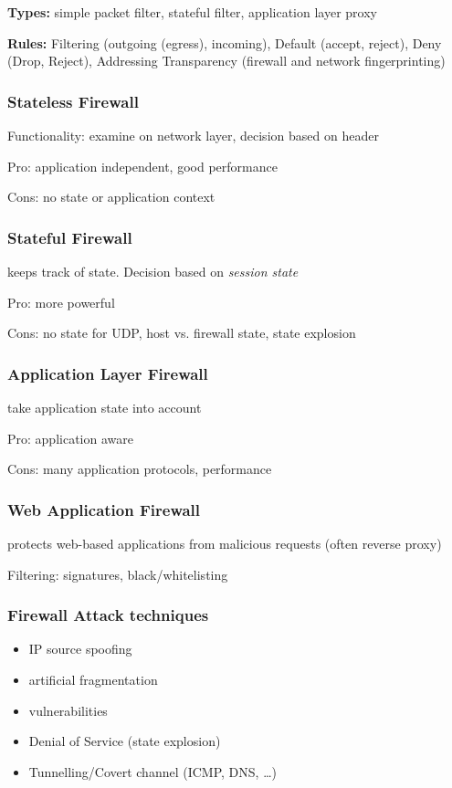 \documentclass[fs, footer]{latex4ei}
\begin{document}
\begin{multicols*}{4}
{\textbf{Types:} simple packet filter, stateful filter, application layer proxy

\textbf{Rules:} Filtering (outgoing (egress), incoming), Default (accept, reject), Deny (Drop, Reject), Addressing Transparency (firewall and network fingerprinting)

\subsubsection{Stateless Firewall}
Functionality: examine on network layer, decision based on header

Pro: application independent, good performance

Cons: no state or application context

\subsubsection{Stateful Firewall}
keeps track of state. Decision based on \emph{session state}

Pro: more powerful

Cons: no state for UDP, host vs. firewall state, state explosion

 \subsubsection{Application Layer Firewall}
 take application state into account

 Pro: application aware

 Cons: many application protocols, performance

 \subsubsection{Web Application Firewall}
protects web-based applications from malicious requests (often reverse proxy)

Filtering: signatures, black/whitelisting

 \subsubsection{Firewall Attack techniques}
 \begin{itemize}
 	\item IP source spoofing
 	\item artificial fragmentation
 	\item vulnerabilities
 	\item Denial of Service (state explosion)
 	\item Tunnelling/Covert channel (ICMP, DNS, \ldots)
 \end{itemize}

}
\end{multicols*}
\end{document}
